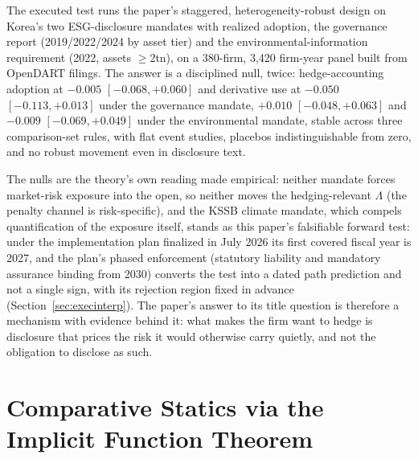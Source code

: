 \documentclass[11pt,a4paper]{article}
\begin{document}
The executed test runs the paper's staggered, heterogeneity-robust design on Korea's two ESG-disclosure mandates with realized adoption, the governance report (2019/2022/2024 by asset tier) and the environmental-information requirement (2022, assets $\ge$2tn), on a 380-firm, 3{,}420 firm-year panel built from OpenDART filings. The answer is a disciplined null, twice: hedge-accounting adoption at $-0.005$ $[-0.068,+0.060]$ and derivative use at $-0.050$ $[-0.113,+0.013]$ under the governance mandate, $+0.010$ $[-0.048,+0.063]$ and $-0.009$ $[-0.069,+0.049]$ under the environmental mandate, stable across three comparison-set rules, with flat event studies, placebos indistinguishable from zero, and no robust movement even in disclosure text.

The nulls are the theory's own reading made empirical: neither mandate forces market-risk exposure into the open, so neither moves the hedging-relevant $\Lambda$ (the penalty channel is risk-specific), and the KSSB climate mandate, which compels quantification of the exposure itself, stands as this paper's falsifiable forward test: under the implementation plan finalized in July 2026 its first covered fiscal year is 2027, and the plan's phased enforcement (statutory liability and mandatory assurance binding from 2030) converts the test into a dated path prediction and not a single sign, with its rejection region fixed in advance (Section~\ref{sec:execinterp}). The paper's answer to its title question is therefore a mechanism with evidence behind it: what makes the firm want to hedge is disclosure that prices the risk it would otherwise carry quietly, and not the obligation to disclose as such.

\appendix
\section{Comparative Statics via the Implicit Function Theorem}
\label{sec:appendix}
\end{document}

